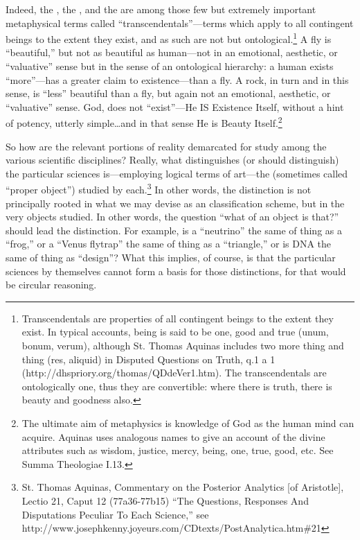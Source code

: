 Indeed, the , the , and the  are among those few but extremely important metaphysical terms called ``transcendentals''---terms which apply to all contingent beings to the extent they exist, and as such are not  but ontological.\footnote{Transcendentals are properties of all contingent beings to the extent they exist. In typical accounts, being is said to be one, good and true (unum, bonum, verum), although St. Thomas Aquinas includes two more thing and thing (res, aliquid) in Disputed Questions on Truth, q.1 a 1 (http://dhspriory.org/thomas/QDdeVer1.htm). The transcendentals are ontologically one, thus they are convertible: where there is truth, there is beauty and goodness also.} A fly is ``beautiful,'' but not as beautiful as human---not in an emotional, aesthetic, or ``valuative'' sense but in the sense of an ontological hierarchy: a human exists ``more''---has a greater claim to existence---than a fly. A rock, in turn and in this sense, is ``less'' beautiful than a fly, but again not an emotional, aesthetic, or ``valuative'' sense. God, does not ``exist''---He IS Existence Itself, without a hint of potency, utterly simple\ldots and in that sense He is Beauty Itself.\footnote{The ultimate aim of metaphysics is knowledge of God as the human mind can acquire. Aquinas uses analogous names to give an account of the divine attributes such as wisdom, justice, mercy, being, one, true, good, etc. See Summa Theologiae I.13.}

So how are the relevant portions of reality demarcated for study among the various scientific disciplines? Really, what distinguishes (or should distinguish) the particular sciences is---employing logical terms of art---the  (sometimes called ``proper object'') studied by each.\footnote{St. Thomas Aquinas, Commentary on the Posterior Analytics [of Aristotle], Lectio 21, Caput 12 (77a36-77b15) ``The Questions, Responses And Disputations Peculiar To Each Science,'' see http://www.josephkenny.joyeurs.com/CDtexts/PostAnalytica.htm\#21} In other words, the distinction is not principally rooted in what we may devise as an  classification scheme, but in the very objects studied. In other words, the question ``what  of an object is that?'' should lead the distinction. For example, is a ``neutrino'' the same  of thing as a ``frog,'' or a ``Venus flytrap'' the same  of thing as a ``triangle,'' or is DNA the same  of thing as ``design''? What this implies, of course, is that the particular sciences by themselves cannot form a basis for those distinctions, for that would be circular reasoning.

